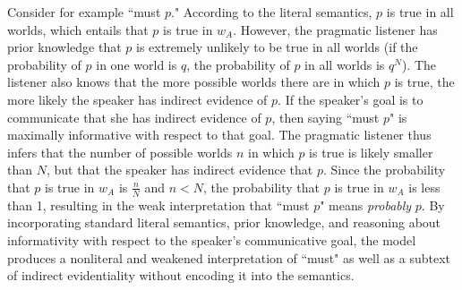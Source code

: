 \documentclass[12pt]{article}
\begin{document}
Consider for example ``must $p$." According to the literal semantics, $p$ is true in all worlds, which entails that $p$ is true in $w_A$. However, the pragmatic listener has prior knowledge that $p$ is extremely unlikely to be true in all worlds (if the probability of $p$ in one world is $q$, the probability of $p$ in all worlds is $q^N$). The listener also knows that the more possible worlds there are in which $p$ is true, the more likely the speaker has indirect evidence of $p$. If the speaker's goal is to communicate that she has indirect evidence of $p$, then saying ``must $p$" is maximally informative with respect to that goal. The pragmatic listener thus infers that the number of possible worlds $n$ in which $p$ is true is likely smaller than $N$, but that the speaker has indirect evidence that $p$. Since the probability that $p$ is true in $w_A$ is $\frac{n}{N}$ and $n < N$, the probability that $p$ is true in $w_A$ is less than 1, resulting in the weak interpretation that ``must $p$" means \emph{probably} $p$. By incorporating standard literal semantics, prior knowledge, and reasoning about informativity with respect to the speaker's communicative goal, the model produces a nonliteral and weakened interpretation of ``must" as well as a subtext of indirect evidentiality without encoding it into the semantics. 








\newpage



\end{document}
